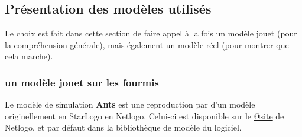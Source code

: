 





%

%


\subsection{Présentation des modèles utilisés}

Le choix est fait dans cette section de faire appel à la fois un modèle jouet (pour la compréhension générale), mais également un modèle réel (pour montrer que cela marche).  

\subsubsection{un modèle jouet sur les fourmis}

Le modèle de simulation \textbf{Ants} est une reproduction par \textcite{Wilensky1997} d'un modèle originellement en StarLogo en Netlogo. Celui-ci est disponible sur le \href{http://ccl.northwestern.edu/netlogo/models/Ants}{@site} de Netlogo, et par défaut dans la bibliothèque de modèle du logiciel.

